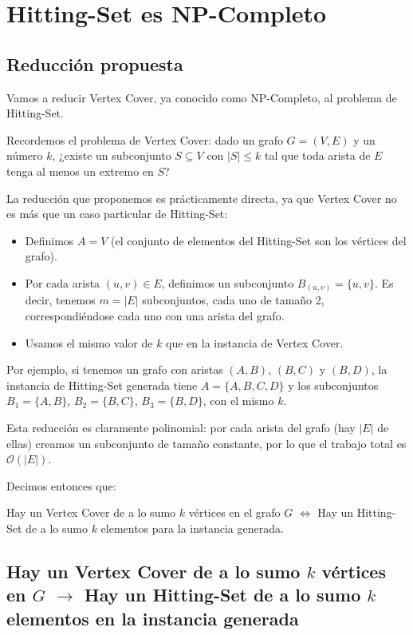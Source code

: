 \section{Hitting-Set es NP-Completo}

\subsection{Reducción propuesta}

Vamos a reducir Vertex Cover, ya conocido como NP-Completo, al problema de Hitting-Set.

Recordemos el problema de Vertex Cover: dado un grafo $G = (V, E)$ y un número $k$, ¿existe un subconjunto $S \subseteq V$
con $|S| \leq k$ tal que toda arista de $E$ tenga al menos un extremo en $S$?

La reducción que proponemos es prácticamente directa, ya que Vertex Cover no es más que un caso particular de Hitting-Set:

\begin{itemize}
    \item Definimos $A = V$ (el conjunto de elementos del Hitting-Set son los vértices del grafo).
    \item Por cada arista $(u, v) \in E$, definimos un subconjunto $B_{(u,v)} = \{u, v\}$. Es decir, tenemos $m = |E|$
    subconjuntos, cada uno de tamaño 2, correspondiéndose cada uno con una arista del grafo.
    \item Usamos el mismo valor de $k$ que en la instancia de Vertex Cover.
\end{itemize}

Por ejemplo, si tenemos un grafo con aristas $(A,B)$, $(B,C)$ y $(B,D)$, la instancia de Hitting-Set generada tiene
$A = \{A, B, C, D\}$ y los subconjuntos $B_1 = \{A, B\}$, $B_2 = \{B, C\}$, $B_3 = \{B, D\}$, con el mismo $k$.

Esta reducción es claramente polinomial: por cada arista del grafo (hay $|E|$ de ellas) creamos un subconjunto de tamaño
constante, por lo que el trabajo total es $\mathcal{O}(|E|)$.

Decimos entonces que:

Hay un Vertex Cover de a lo sumo $k$ vértices en el grafo $G$ $\iff$ Hay un Hitting-Set de a lo sumo $k$ elementos para la
instancia generada.

\subsection*{Hay un Vertex Cover de a lo sumo $k$ vértices en $G$ $\rightarrow$ Hay un Hitting-Set de a lo sumo $k$ elementos
en la instancia generada}

